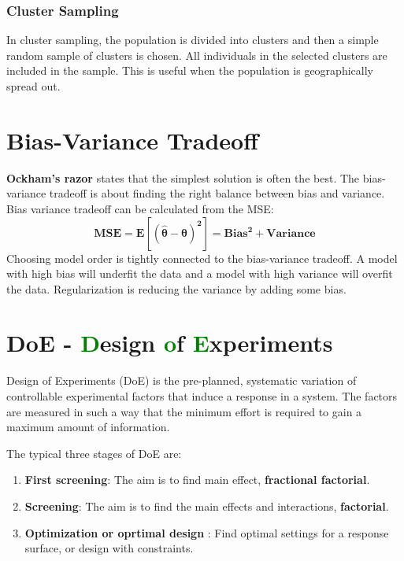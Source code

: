 \subsubsection{Cluster Sampling}
In cluster sampling, the population is divided into clusters and then a simple random sample of clusters is chosen. All individuals in the selected clusters are included in the sample. This is useful when the population is geographically spread out. \newline


\section{Bias-Variance Tradeoff}
\textbf{Ockham's razor} states that the simplest solution is often the best. The bias-variance tradeoff is about finding the right balance between bias and variance. \newline
Bias variance tradeoff can be calculated from the MSE:
\begin{equation}
    \mathbf{
    MSE = E[(\hat{\theta} - \theta)^2] = Bias^2 + Variance
    }
\end{equation}
Choosing model order is tightly connected to the bias-variance tradeoff. A model with high bias will underfit the data and a model with high variance will overfit the data. \newline
Regularization is reducing the variance by adding some bias. 



\section{DoE - \textcolor{green}{D}esign \textcolor{green}{o}f \textcolor{green}{E}xperiments}
Design of Experiments (DoE) is the pre-planned, systematic variation of
controllable experimental factors that induce a response in a system. The
factors are measured in such a way that the minimum effort is required to
gain a maximum amount of information.

The typical three stages of DoE are:
\begin{enumerate}
    \item \textbf{First screening}: The aim is to find main effect, \textbf{fractional factorial}.
    \item \textbf{Screening}: The aim is to find the main effects and interactions, \textbf{factorial}.
    \item \textbf{Optimization or oprtimal design }: Find optimal settings for a response surface, or design with constraints.
\end{enumerate}

